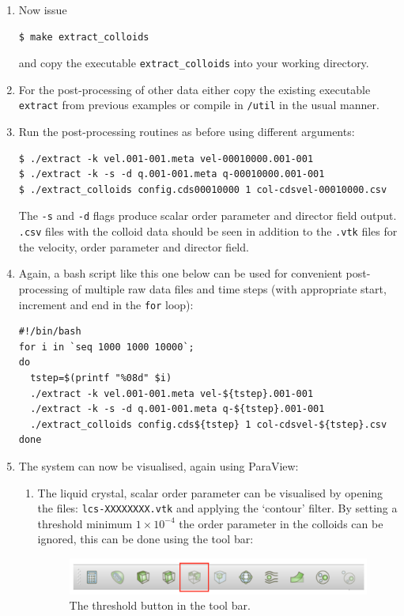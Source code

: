 \documentclass[11pt,twoside,a4paper]{article}
\begin{document}
\begin{enumerate}
\begin{enumerate}
\end{enumerate}
\item Now issue
\begin{lstlisting}
$ make extract_colloids
\end{lstlisting}
and copy the executable \texttt{extract\_colloids} into your working directory.
\item For the post-processing of other data either copy the existing executable \texttt{extract} from 
previous examples or compile in \texttt{/util} in the usual manner.
\item Run the post-processing routines as before using different arguments:
\begin{lstlisting}
$ ./extract -k vel.001-001.meta vel-00010000.001-001
$ ./extract -k -s -d q.001-001.meta q-00010000.001-001
$ ./extract_colloids config.cds00010000 1 col-cdsvel-00010000.csv
\end{lstlisting}
The \texttt{-s} and \texttt{-d} flags produce scalar order parameter and director field output.
\texttt{.csv} files with the colloid data should 
be seen in addition to the \texttt{.vtk} files for the velocity, order parameter and director field.
\item Again, a bash script like this one below can be used for convenient post-processing of multiple raw data files and time steps (with appropriate start, increment and end in the \texttt{for} loop):
\begin{lstlisting}
#!/bin/bash
for i in `seq 1000 1000 10000`;
do
  tstep=$(printf "%08d" $i)
  ./extract -k vel.001-001.meta vel-${tstep}.001-001  
  ./extract -k -s -d q.001-001.meta q-${tstep}.001-001
  ./extract_colloids config.cds${tstep} 1 col-cdsvel-${tstep}.csv
done
\end{lstlisting}
\item The system can now be visualised, again using ParaView:
\begin{enumerate}
\item The liquid crystal, scalar order parameter can be visualised by opening the files: 
\texttt{lcs-XXXXXXXX.vtk} and applying the `contour' filter. By setting a threshold 
minimum $1 \times 10^{-4}$ the order parameter in the colloids can be ignored, this can be done using the tool bar:

\begin{figure}[H]
\begin{center}
\includegraphics[width=0.8\linewidth]{thresh.png}
  \caption{The threshold button in the tool bar.}
  \label{fig:thresh}
  \end{center}
\end{figure}


\end{enumerate}
\end{enumerate}
\end{document}
